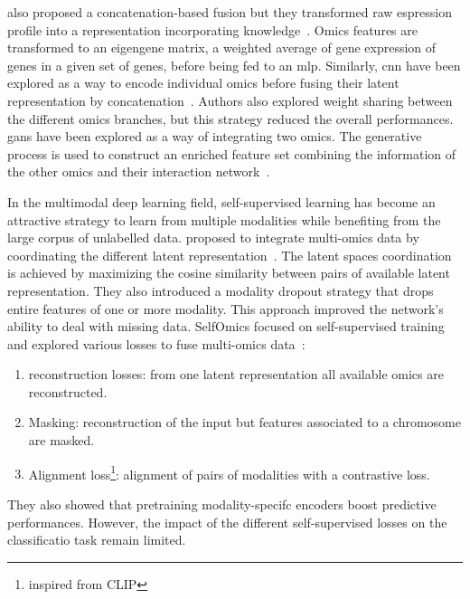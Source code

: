 \documentclass[../main.tex]{subfiles}
\begin{document}
			\citeauthor{SALMON} also proposed a concatenation-based fusion but they transformed raw espression profile into a representation incorporating knowledge~\cite{SALMON}.
			Omics features are transformed to an eigengene matrix, a weighted average of gene expression of genes in a given set of genes, before being fed to an \gls{mlp}.
			Similarly, \gls{cnn} have been explored as a way to encode individual omics before fusing their latent representation by concatenation~\cite{MohaiminulIslam2020}.
			Authors also explored weight sharing between the different omics branches, but this strategy reduced the overall performances.
			\Glspl{gan} have been explored as a way of integrating two omics.
			The generative process is used to construct an enriched feature set combining the information of the other omics and their interaction network~\cite{omicsGAN}.

			In the multimodal deep learning field, self-supervised learning has become an attractive strategy to learn from multiple modalities while benefiting from the large corpus of unlabelled data.
			\citeauthor{Cheerla2019} proposed to integrate multi-omics data by coordinating the different latent representation~\cite{Cheerla2019}.
			The latent spaces coordination is achieved by maximizing the cosine similarity between pairs of available latent representation.
			They also introduced a modality dropout strategy that drops entire features of one or more modality.
			This approach improved the network’s ability to deal with missing data.
			SelfOmics focused on self-supervised training and explored various losses to fuse multi-omics data~\cite{selfOmics}:
			\begin{enumerate}[nosep]
				\item reconstruction losses: from one latent representation all available omics are reconstructed.
				\item Masking: reconstruction of the input but features associated to a chromosome are masked.
				\item Alignment loss\footnote{inspired from CLIP}: alignment of pairs of modalities with a contrastive loss.
			\end{enumerate}
			They also showed that pretraining modality-specifc encoders boost predictive performances.
			However, the impact of the different self-supervised losses on the classificatio task remain limited.
\end{document}
